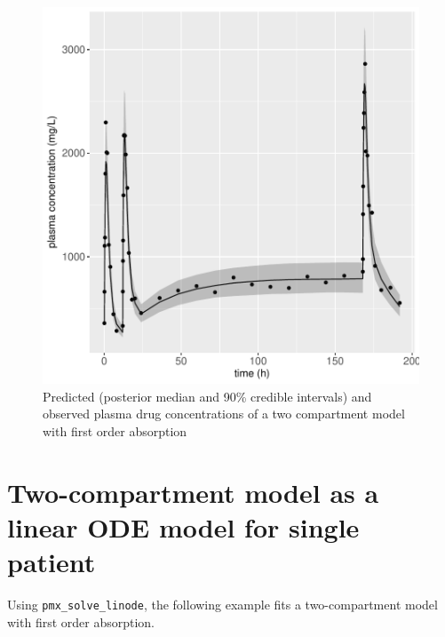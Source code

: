 \documentclass[11pt, reqno, oneside]{amsbook}
\numberwithin{equation}{chapter}
\numberwithin{figure}{chapter}
\numberwithin{table}{chapter}
\theoremstyle{remark}
\begin{document}
\begin{figure}[htbp]
\centering
\includegraphics[width=0.5\linewidth]{../example-models/R/deliv/figure/TwoCptModel/TwoCptModelPlots006.pdf}
\caption{\label{twocpt_mcmc_predict}
Predicted (posterior median and 90\% credible intervals) and observed plasma drug concentrations of a two compartment model with first order absorption}
\end{figure}

\section{Two-compartment model as a linear ODE model for single patient}
\label{sec:org2c5d276}
Using \texttt{pmx\_solve\_linode}, the following example fits a two-compartment model
with first order absorption.
\end{document}
